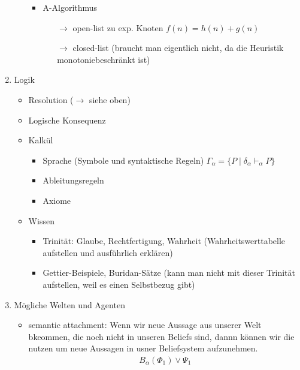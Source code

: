 \documentclass[runningheads,deutsch]{llncs}
\begin{document}
\begin{enumerate}
\begin{enumerate}
\begin{itemize}
\begin{itemize}
\begin{itemize}
                \end{itemize}
            \end{itemize}
            \item A-Algorithmus
            \begin{itemize}
                \item[$\rightarrow$] open-list zu exp. Knoten $f(n) = h(n) + g(n)$ 
                \item[$\rightarrow$] closed-list (braucht man eigentlich nicht, da die Heuristik monotoniebeschränkt ist)
            \end{itemize}
        \end{itemize}
    \end{enumerate}
    \item Logik
    \begin{itemize}
        \item Resolution ($\rightarrow$ siehe oben)
        \item Logische Konsequenz
        \item Kalkül
        \begin{itemize}
            \item Sprache (Symbole und syntaktische Regeln) $\Gamma_\alpha= \{P \; |\; \delta_\alpha \vdash_\alpha P\}$
            \item Ableitungsregeln
            \item Axiome
        \end{itemize}
        \item Wissen
        \begin{itemize}
            \item Trinität: Glaube, Rechtfertigung, Wahrheit (Wahrheitswerttabelle aufstellen und ausführlich erklären)
            \item Gettier-Beispiele, Buridan-Sätze (kann man nicht mit dieser Trinität aufstellen, weil es einen Selbstbezug gibt)
        \end{itemize}
    \end{itemize}
    \item Mögliche Welten und Agenten
    \begin{itemize}
        \item semantic attachment: Wenn wir neue Aussage aus unserer Welt bkeommen, die noch nicht in unseren Beliefs sind, dannn können wir die nutzen um neue Aussagen in usner Beliefsystem aufzunehmen.
        \begin{align*}
            B_\alpha(\Phi_1) \lor \Psi_1 \\

\end{align*}
\end{itemize}
\end{enumerate}
\end{document}

